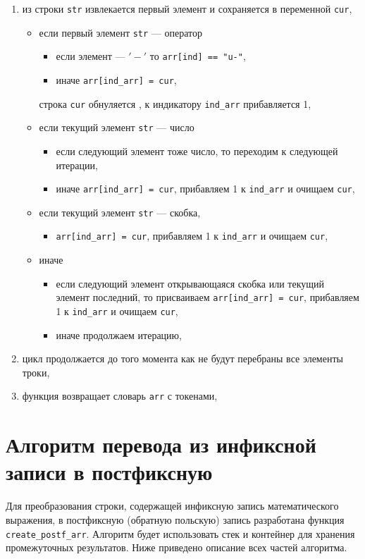 \begin{enumerate}
	\item из строки \texttt{str} извлекается первый элемент и сохраняется в переменной \texttt{cur},
	\begin{itemize}
		\item если первый элемент \texttt{str} --- оператор
		\begin{itemize}
			\item если элемент --- $'-'$ то \texttt{arr[ind] == "u-"},
			\item иначе \texttt{arr[ind\_arr] = cur},
		\end{itemize}
		строка \texttt{cur} обнуляется , к индикатору \texttt{ind\_arr} прибавляется 1,
		
		\item если текущий элемент \texttt{str} --- число
		\begin{itemize}
			\item если следующий элемент тоже число, то переходим к следующей итерации,
			\item иначе \texttt{arr[ind\_arr] = cur}, прибавляем 1 к \texttt{ind\_arr} и очищаем \texttt{cur},
		\end{itemize}
		
		\item если текущий элемент \texttt{str} --- скобка,
		\begin{itemize}
			\item \texttt{arr[ind\_arr] = cur}, прибавляем 1 к \texttt{ind\_arr} и очищаем \texttt{cur},
		\end{itemize}
		
		\item иначе
		\begin{itemize}
			\item если следующий элемент открывающаяся скобка или текущий элемент последний, то присваиваем \texttt{arr[ind\_arr] = cur}, прибавляем 1 к \texttt{ind\_arr} и очищаем \texttt{cur},
			\item иначе продолжаем итерацию,
		\end{itemize}
	\end{itemize}
	
	\item цикл продолжается до того момента как не будут перебраны все элементы троки,
	\item функция возвращает словарь \texttt{arr} с токенами,
\end{enumerate}

\section{Алгоритм перевода из инфиксной записи в постфиксную}
Для преобразования строки, содержащей инфиксную запись математического выражения, в постфиксную (обратную польскую) запись разработана функция \texttt{create\_postf\_arr}. Алгоритм будет использовать стек и контейнер для хранения промежуточных результатов. Ниже приведено описание всех частей алгоритма.
